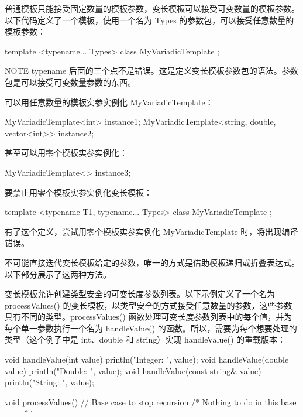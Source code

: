 
普通模板只能接受固定数量的模板参数，变长模板可以接受可变数量的模板参数。以下代码定义了一个模板，使用一个名为 Types 的参数包，可以接受任意数量的模板参数：

\begin{cpp}
template <typename... Types>
class MyVariadicTemplate { };
\end{cpp}

\begin{myNotic}{NOTE}
typename 后面的三个点不是错误。这是定义变长模板参数包的语法。参数包是可以接受可变数量参数的东西。
\end{myNotic}

可以用任意数量的模板实参实例化 MyVariadicTemplate：

\begin{cpp}
MyVariadicTemplate<int> instance1;
MyVariadicTemplate<string, double, vector<int>> instance2;
\end{cpp}

甚至可以用零个模板实参实例化：

\begin{cpp}
MyVariadicTemplate<> instance3;
\end{cpp}

要禁止用零个模板实参实例化变长模板：

\begin{cpp}
template <typename T1, typename... Types>
class MyVariadicTemplate { };
\end{cpp}

有了这个定义，尝试用零个模板实参实例化 MyVariadicTemplate 时，将出现编译错误。

不可能直接迭代变长模板给定的参数，唯一的方式是借助模板递归或折叠表达式。以下部分展示了这两种方法。


变长模板允许创建类型安全的可变长度参数列表。以下示例定义了一个名为 processValues() 的变长模板，以类型安全的方式接受任意数量的参数，这些参数具有不同的类型。processValues() 函数处理可变长度参数列表中的每个值，并为每个单一参数执行一个名为 handleValue() 的函数。所以，需要为每个想要处理的类型（这个例子中是 int、double 和 string）实现 handleValue() 的重载版本：

\begin{cpp}
void handleValue(int value) { println("Integer: {}", value); }
void handleValue(double value) { println("Double: {}", value); }
void handleValue(const string& value) { println("String: {}", value); }

void processValues() // Base case to stop recursion
{ /* Nothing to do in this base case. */ }

template <typename T1, typename... Tn>
void processValues(const T1& arg1, const Tn&... args)
{
    handleValue(arg1);
    processValues(args...);
}
\end{cpp}

